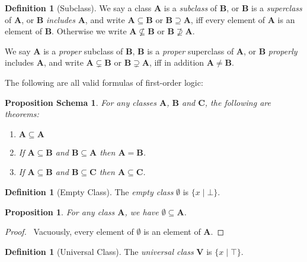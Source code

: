\documentclass{book}
\let\qed\relax
\newtheorem{prop}[ax]{Proposition}
\newtheorem{props}[ax]{Proposition Schema}
\theoremstyle{definition}
\newtheorem{df}[ax]{Definition}
\begin{document}
\begin{df}[Subclass]
We say a class $\mathbf{A}$ is a \emph{subclass} of $\mathbf{B}$, or $\mathbf{B}$ is a \emph{superclass} of $\mathbf{A}$, or $\mathbf{B}$ \emph{includes} $\mathbf{A}$, and write $\mathbf{A} \subseteq \mathbf{B}$ or $\mathbf{B} \supseteq \mathbf{A}$, iff every element of $\mathbf{A}$ is an element of $\mathbf{B}$. Otherwise we write $\mathbf{A} \nsubseteq \mathbf{B}$ or $\mathbf{B} \nsupseteq \mathbf{A}$.

We say $\mathbf{A}$ is a \emph{proper} subclass of $\mathbf{B}$, $\mathbf{B}$ is a \emph{proper} superclass of $\mathbf{A}$, or $\mathbf{B}$ \emph{properly} includes $\mathbf{A}$, and write $\mathbf{A} \subsetneq \mathbf{B}$ or $\mathbf{B} \supsetneq \mathbf{A}$, iff in addition $\mathbf{A} \neq \mathbf{B}$.
\end{df}

The following are all valid formulas of first-order logic:

\begin{props}
\label{prop:subclass}
For any classes $\mathbf{A}$, $\mathbf{B}$ and $\mathbf{C}$, the following are theorems:
\begin{enumerate}
\item $\mathbf{A} \subseteq \mathbf{A}$
\item If $\mathbf{A} \subseteq \mathbf{B}$ and $\mathbf{B} \subseteq \mathbf{A}$ then $\mathbf{A} = \mathbf{B}$.
\item If $\mathbf{A} \subseteq \mathbf{B}$ and $\mathbf{B} \subseteq \mathbf{C}$ then $\mathbf{A} \subseteq \mathbf{C}$.
\end{enumerate}
\end{props}

\begin{df}[Empty Class]
The \emph{empty class} $\emptyset$ is $\{ x \mid \bot\}$.
\end{df}

\begin{prop}
For any class $\mathbf{A}$, we have $\emptyset \subseteq \mathbf{A}$.
\end{prop}

\begin{proof}
\pf\ Vacuously, every element of $\emptyset$ is an element of $\mathbf{A}$. \qed	
\end{proof}

\begin{df}[Universal Class]
The \emph{universal class} $\mathbf{V}$ is $\{ x \mid \top \}$.
\end{df}
\end{document}
